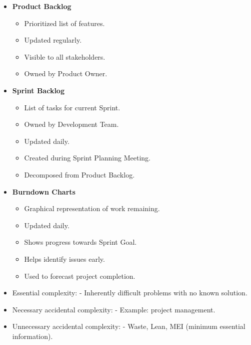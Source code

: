 \documentclass[10pt]{article}
\begin{document}
\begin{multicols}{5}
\begin{block}
    \begin{itemize}
        \item \textbf{Product Backlog}
        \begin{itemize}
            \item Prioritized list of features.
            \item Updated regularly.
            \item Visible to all stakeholders.
            \item Owned by Product Owner.
        \end{itemize}
        \item \textbf{Sprint Backlog}
        \begin{itemize}
            \item List of tasks for current Sprint.
            \item Owned by Development Team.
            \item Updated daily.
            \item Created during Sprint Planning Meeting.
            \item Decomposed from Product Backlog.
        \end{itemize}
        \item \textbf{Burndown Charts}
        \begin{itemize}
            \item Graphical representation of work remaining.
            \item Updated daily.
            \item Shows progress towards Sprint Goal.
            \item Helps identify issues early.
            \item Used to forecast project completion.
        \end{itemize}
    \end{itemize}
\end{block}

\begin{block}
\begin{itemize}
  \item Essential complexity:
    - Inherently difficult problems with no known solution.
  \item Necessary accidental complexity:
    - Example: project management.
  \item Unnecessary accidental complexity:
    - Waste, Lean, MEI (minimum essential information).
\end{itemize}
\end{block}


\end{multicols}
\end{document}
